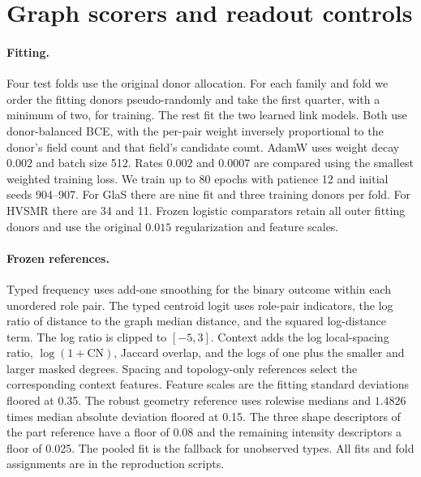 \begin{table}[t]
\centering
\caption{Graph ranking and response results. Source and Edited rank targets by the observed-state anomaly score (geometry uses its fixed readout). Response ranks absolute change in conditional probability or change in the geometry readout. The edited intervals are donor paired. GlaS and HVSMR use 78 and 59 source graphs in the original length tier. The pair MLP and frozen GNN controls keep conditional probability fixed.}
\label{tab:previous_graph}
\scriptsize
\setlength{\tabcolsep}{3.5pt}

\end{table}
\section{Graph scorers and readout controls}
\paragraph{Fitting.}
Four test folds use the original donor allocation. For each family and fold we order the fitting donors pseudo-randomly and take the first quarter, with a minimum of two, for training. The rest fit the two learned link models. Both use donor-balanced BCE, with the per-pair weight inversely proportional to the donor's field count and that field's candidate count. AdamW uses weight decay $0.002$ and batch size 512. Rates $0.002$ and $0.0007$ are compared using the smallest weighted training loss. We train up to 80 epochs with patience 12 and initial seeds 904--907. For GlaS there are nine fit and three training donors per fold. For HVSMR there are 34 and 11. Frozen logistic comparators retain all outer fitting donors and use the original $0.015$ regularization and feature scales.

\paragraph{Frozen references.}
Typed frequency uses add-one smoothing for the binary outcome within each unordered role pair. The typed centroid logit uses role-pair indicators, the log ratio of distance to the graph median distance, and the squared log-distance term. The log ratio is clipped to $[-5,3]$. Context adds the log local-spacing ratio, $\log(1+\mathrm{CN})$, Jaccard overlap, and the logs of one plus the smaller and larger masked degrees. Spacing and topology-only references select the corresponding context features. Feature scales are the fitting standard deviations floored at 0.35. The robust geometry reference uses rolewise medians and $1.4826$ times median absolute deviation floored at 0.15. The three shape descriptors of the part reference have a floor of 0.08 and the remaining intensity descriptors a floor of 0.025. The pooled fit is the fallback for unobserved types. All fits and fold assignments are in the reproduction scripts.

